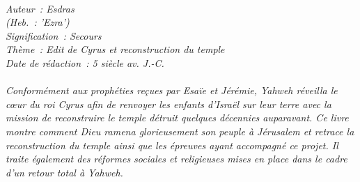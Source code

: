 \BFont
\noindent\hrulefill
{\footnotesize
\textit{
\bigskip
{\centering{}
\\Auteur~: Esdras
\\(Heb.~: 'Ezra')
\\Signification~: Secours
\\Thème~: Edit de Cyrus et reconstruction du temple 
\\Date de rédaction~: 5 siècle av. J.-C.\\}
}
\textit{
\\Conformément aux prophéties reçues par Esaïe et Jérémie, Yahweh réveilla le cœur du roi Cyrus afin de renvoyer les enfants d'Israël sur leur terre avec la mission de reconstruire le temple détruit quelques décennies auparavant. Ce livre montre comment Dieu ramena glorieusement son peuple à Jérusalem et retrace la reconstruction du temple ainsi que les épreuves ayant accompagné ce projet. Il traite également des réformes sociales et religieuses mises en place dans le cadre d'un retour total à Yahweh.\bigskip
}
}
\par\nobreak\noindent\hrulefill
